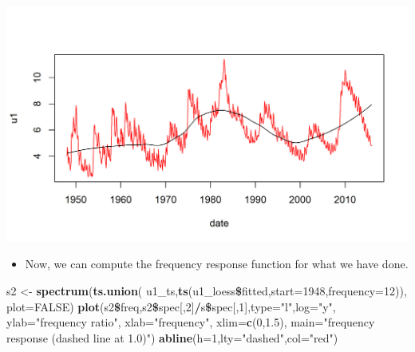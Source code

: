 \documentclass[]{article}
\newenvironment{Shaded}{\begin{snugshade}}{\end{snugshade}}
\newcommand{\KeywordTok}[1]{\textcolor[rgb]{0.13,0.29,0.53}{\textbf{#1}}}
\newcommand{\DataTypeTok}[1]{\textcolor[rgb]{0.13,0.29,0.53}{#1}}
\newcommand{\DecValTok}[1]{\textcolor[rgb]{0.00,0.00,0.81}{#1}}
\newcommand{\FloatTok}[1]{\textcolor[rgb]{0.00,0.00,0.81}{#1}}
\newcommand{\StringTok}[1]{\textcolor[rgb]{0.31,0.60,0.02}{#1}}
\newcommand{\OtherTok}[1]{\textcolor[rgb]{0.56,0.35,0.01}{#1}}
\newcommand{\OperatorTok}[1]{\textcolor[rgb]{0.81,0.36,0.00}{\textbf{#1}}}
\newcommand{\NormalTok}[1]{#1}
\providecommand{\tightlist}{%
  \setlength{\itemsep}{0pt}\setlength{\parskip}{0pt}}
\begin{document}
\begin{center}\includegraphics{figure/intro-loess-1} \end{center}

\begin{itemize}
\tightlist
\item
  Now, we can compute the frequency response function for what we have
  done.
\end{itemize}

\begin{Shaded}
\begin{Highlighting}[]
\NormalTok{s2 <-}\StringTok{ }\KeywordTok{spectrum}\NormalTok{(}\KeywordTok{ts.union}\NormalTok{(}
\NormalTok{  u1_ts,}\KeywordTok{ts}\NormalTok{(u1_loess}\OperatorTok{\$}\NormalTok{fitted,}\DataTypeTok{start=}\DecValTok{1948}\NormalTok{,}\DataTypeTok{frequency=}\DecValTok{12}\NormalTok{)),}
  \DataTypeTok{plot=}\OtherTok{FALSE}\NormalTok{)}
\KeywordTok{plot}\NormalTok{(s2}\OperatorTok{\$}\NormalTok{freq,s2}\OperatorTok{\$}\NormalTok{spec[,}\DecValTok{2}\NormalTok{]}\OperatorTok{/}\NormalTok{s}\OperatorTok{\$}\NormalTok{spec[,}\DecValTok{1}\NormalTok{],}\DataTypeTok{type=}\StringTok{"l"}\NormalTok{,}\DataTypeTok{log=}\StringTok{"y"}\NormalTok{,}
  \DataTypeTok{ylab=}\StringTok{"frequency ratio"}\NormalTok{, }\DataTypeTok{xlab=}\StringTok{"frequency"}\NormalTok{, }\DataTypeTok{xlim=}\KeywordTok{c}\NormalTok{(}\DecValTok{0}\NormalTok{,}\FloatTok{1.5}\NormalTok{),}
  \DataTypeTok{main=}\StringTok{"frequency response (dashed line at 1.0)"}\NormalTok{)}
\KeywordTok{abline}\NormalTok{(}\DataTypeTok{h=}\DecValTok{1}\NormalTok{,}\DataTypeTok{lty=}\StringTok{"dashed"}\NormalTok{,}\DataTypeTok{col=}\StringTok{"red"}\NormalTok{)}
\end{Highlighting}
\end{Shaded}
\end{document}

